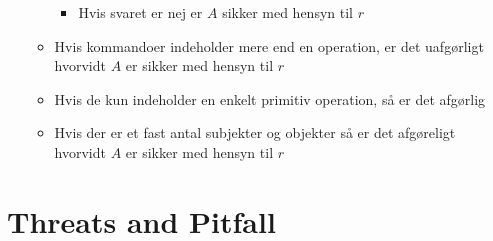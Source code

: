 \documentclass[a4, english]{article}
\begin{document}
\begin{itemize}
\begin{itemize}
    \begin{itemize}
    	\item Hvis svaret er nej er $A$ sikker med hensyn til $r$  
    \end{itemize}
    \item Hvis kommandoer indeholder mere end en operation, er det uafgørligt hvorvidt $A$ er sikker med hensyn til $r$   
    \item Hvis de kun indeholder en enkelt primitiv operation, så er det afgørlig
    \item Hvis der er et fast antal subjekter og objekter så er det afgøreligt hvorvidt $A$ er sikker med hensyn til $r$ 
  \end{itemize}
\end{itemize}
\newpage

\section{Threats and Pitfall}
\end{document}

